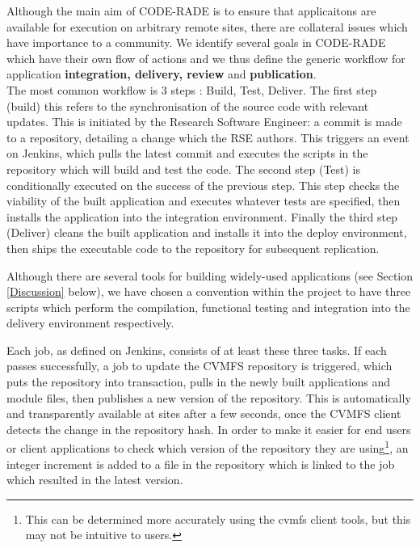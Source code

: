 \documentclass[a4paper]{jpconf}
\begin{document}
    Although the main aim of CODE-RADE is to ensure that applicaitons are available for execution on
    arbitrary remote sites, there are collateral issues which have importance to a community. We
    identify several goals in CODE-RADE which have their own flow of actions and we thus define the
    generic workflow for application {\bf integration, delivery, review} and {\bf publication}.\\

	The most common workflow is 3 steps : Build, Test, Deliver.  
    The first step (build) this refers to the synchronisation of the source code with relevant
    updates. This is initiated by the Research Software Engineer: a commit is made to a repository,
    detailing a change which the RSE authors. This triggers an event on Jenkins, which pulls the
    latest commit and executes the scripts in the repository which will build and test the code. The
    second step (Test) is conditionally executed on the success of the previous step. This step checks
    the viability of the built application and executes whatever tests are specified, then installs
    the application into the integration environment. Finally the third step (Deliver) cleans the
    built application and installs it into the deploy environment, then ships the executable code to
    the repository for subsequent replication.

    Although there are several tools for building widely-used applications (see Section
    \ref{Discussion} below), we have chosen a convention within the project to have three scripts
    which perform the compilation, functional testing and integration into the delivery environment
    respectively. 
    

Each job, as defined on Jenkins, consists of at least these three tasks. If each passes successfully,
a job to update the CVMFS repository is triggered, which puts the repository into transaction, pulls
in the newly built applications and module files, then publishes a new version of the repository.
This is automatically and transparently available at sites after a few seconds, once the CVMFS
client detects the change in the repository hash. In order to make it easier for end users or client
applications to check which version of the repository they are using\footnote{This can be determined
more accurately using the cvmfs client tools, but this may not be intuitive to users.}, an integer
increment is added to a file in the repository which is linked to the job which resulted in the
latest version.
\end{document}
